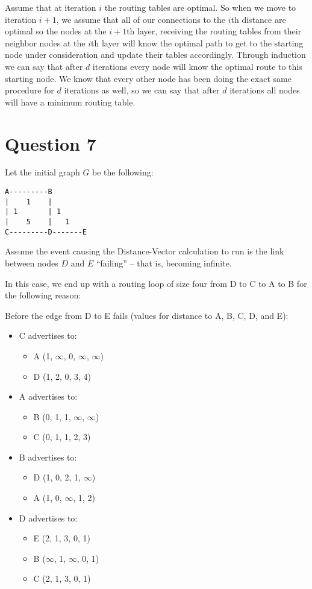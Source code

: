 \documentclass[12pt]{article}
\begin{document}
Assume that at iteration $i$ the routing tables are optimal. So when we move to iteration $i+1$, we assume that all of our connections to the $i$th distance are optimal so the nodes at the $i+1$th layer, receiving the routing tables from their neighbor nodes at the $i$th layer will know the optimal path to get to the starting node under consideration and update their tables accordingly. Through induction we can say that after $d$ iterations every node will know the optimal route to this starting node. We know that every other node has been doing the exact same procedure for $d$ iterations as well, so we can say that after $d$ iterations all nodes will have a minimum routing table.

\section*{Question 7}
Let the initial graph $G$ be the following:
\begin{verbatim}
A---------B
|    1    |
| 1       | 1
|    5    |   1
C---------D-------E
\end{verbatim}

Assume the event causing the Distance-Vector calculation to run is the link between nodes $D$ and $E$ ``failing'' -- that is, becoming infinite.

In this case, we end up with a routing loop of size four from D to C to A to B for the following reason:

Before the edge from D to E fails (values for distance to A, B, C, D, and E):
\begin{itemize}
\item C advertises to:
\begin{itemize}
\item A (1, $\infty$, 0, $\infty$, $\infty$)
\item D (1, 2, 0, 3, 4)
\end{itemize}
\item A advertises to:
\begin{itemize}
\item B (0, 1, 1, $\infty$, $\infty$)
\item C (0, 1, 1, 2, 3)
\end{itemize}
\item B advertises to:
\begin{itemize}
\item D (1, 0, 2, 1, $\infty$)
\item A (1, 0, $\infty$, 1, 2)
\end{itemize}
\item D advertises to:
\begin{itemize}
\item E (2, 1, 3, 0, 1)
\item B ($\infty$, 1, $\infty$, 0, 1)
\item C (2, 1, 3, 0, 1)
\end{itemize}
\end{itemize}
\end{document}
